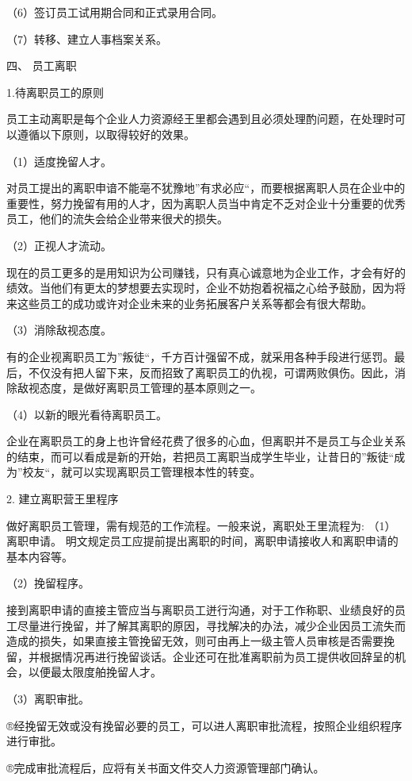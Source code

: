     （6）签订员工试用期合同和正式录用合同。

    （7）转移、建立人事档案关系。

四、 员工离职

    1.待离职员工的原则

    员工主动离职是每个企业人力资源经王里都会遇到且必须处理酌问题，在处理时可以遵循以下原则，以取得较好的效果。

    （1）适度挽留人才。

    对员工提出的离职申谙不能亳不犹豫地”有求必应“，而要根据离职人员在企业中的重要性，努力挽留有用的人才，因为离职人员当中肯定不乏对企业十分重要的优秀员工，他们的流失会给企业带来很犬的损失。

    （2）正视人才流动。

    现在的员工更多的是用知识为公司赚钱，只有真心诚意地为企业工作，才会有好的绩效。当他们有更太的梦想要去实现时，企业不妨抱着祝福之心给予鼓励，因为将来这些员工的成功或许对企业未来的业务拓展客户关系等都会有很大帮助。

    （3）消除敌视态度。

    有的企业视离职员工为”叛徒“，千方百计强留不成，就采用各种手段进行惩罚。最后，不仅没有把人留下来，反而招致了离职员工的仇视，可谓两败俱伤。因此，消除敌视态度，是做好离职员工管理的基本原则之一。

    （4）以新的眼光看待离职员工。

    企业在离职员工的身上也许曾经花费了很多的心血，但离职并不是员工与企业关系的结束，而可以看成是新的开始，若把员工离职当成学生毕业，让昔日的”叛徒“成为”校友“，就可以实现离职员工管理根本性的转变。

    2. 建立离职营王里程序

    做好离职员工管理，需有规范的工作流程。一般来说，离职处王里流程为:
    （1）离职申请。
    明文规定员工应提前提出离职的时间，离职申请接收人和离职申请的基本内容等。

    （2）挽留程序。

    接到离职申请的直接主管应当与离职员工迸行沟通，对于工作称职、业绩良好的员工尽量进行挽留，并了解其离职的原因，寻找解决的办法，减少企业因员工流失而造成的损失，如果直接主管挽留无效，则可由再上一级主管人员审核是否需要挽留，并根据情况再进行挽留谈话。企业还可在批准离职前为员工提供收回辞呈的机会，以便最太限度舶挽留人才。

    （3）离职审批。

    ®经挽留无效或没有挽留必要的员工，可以进人离职审批流程，按照企业组织程序进行审批。

    ®完成审批流程后，应将有关书面文件交人力资源管理部门确认。

